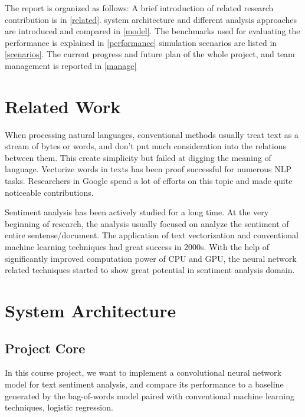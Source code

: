 \documentclass[conference]{IEEEtran}
\begin{document}
    The report is organized as follows: 
    A brief introduction of related research contribution is in \autoref{related}.
    system architecture and different analysis approaches are introduced and compared 
    in \autoref{model}.
    The benchmarks used for evaluating the performance is explained in 
    \autoref{performance}
    simulation scenarios are listed in \autoref{scenarios}.
    The current progress and future plan of the whole project, and team management
    is reported in \autoref{manage}
    
\section{Related Work}
\label{related}
    When processing natural languages, conventional methods usually treat text as 
    a stream of bytes or words, and don't put much consideration into the relations
    between them. This create simplicity but failed at digging the meaning of
    language. Vectorize words in texts has been proof successful for numerous NLP
    tasks. Researchers in Google spend a lot of efforts on this topic and 
    made quite noticeable contributions\cite{mikolov2013efficient, word2vec}.
    
    Sentiment analysis has been actively studied for a long time. At the very beginning
    of research, the analysis usually focused on analyze the sentiment of entire
    sentense/document\cite{sack1994computation}. The application of
    text vectorization and conventional machine learning techniques had great
    success in 2000s\cite{pang2002thumbs}. With the help of significantly improved
    computation power of CPU and GPU, the neural network related techniques 
    started to show great potential in sentiment analysis 
    domain\cite{kim2014convolutional,barnes2017assessing}.
    
\section{System Architecture}
\label{model}
\subsection{Project Core}
\label{model:core}
    In this course project, we want to implement a convolutional neural network
    model for text sentiment analysis, and compare its performance to a baseline
    generated by the bag-of-words model paired with conventional machine learning
    techniques, logistic regression.
    
\end{document}
